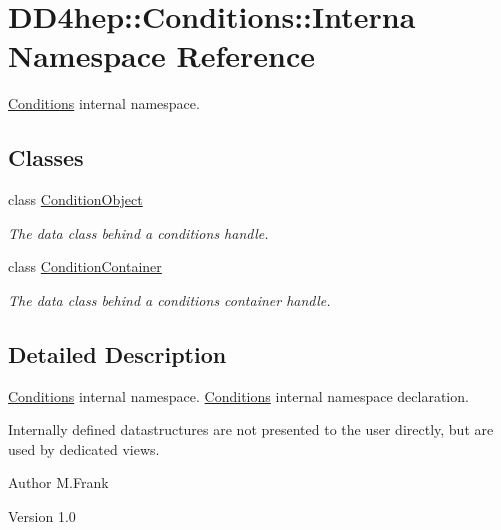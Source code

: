 \hypertarget{namespace_d_d4hep_1_1_conditions_1_1_interna}{
\section{DD4hep::Conditions::Interna Namespace Reference}
\label{namespace_d_d4hep_1_1_conditions_1_1_interna}
}


\hyperlink{namespace_d_d4hep_1_1_conditions}{Conditions} internal namespace.  
\subsection*{Classes}
\begin{DoxyCompactItemize}
\item 
class \hyperlink{class_d_d4hep_1_1_conditions_1_1_interna_1_1_condition_object}{ConditionObject}
\begin{DoxyCompactList}\small\item\em The data class behind a conditions handle. \item\end{DoxyCompactList}\item 
class \hyperlink{class_d_d4hep_1_1_conditions_1_1_interna_1_1_condition_container}{ConditionContainer}
\begin{DoxyCompactList}\small\item\em The data class behind a conditions container handle. \item\end{DoxyCompactList}\end{DoxyCompactItemize}


\subsection{Detailed Description}
\hyperlink{namespace_d_d4hep_1_1_conditions}{Conditions} internal namespace. \hyperlink{namespace_d_d4hep_1_1_conditions}{Conditions} internal namespace declaration.

Internally defined datastructures are not presented to the user directly, but are used by dedicated views.

\begin{DoxyAuthor}{Author}
M.Frank 
\end{DoxyAuthor}
\begin{DoxyVersion}{Version}
1.0 
\end{DoxyVersion}
